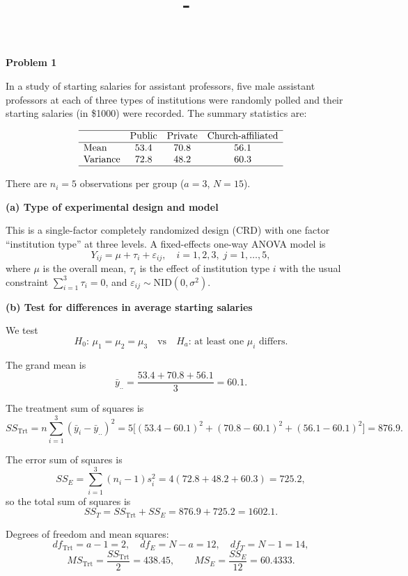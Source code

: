 \documentclass[answers,12pt,addpoints]{exam}
\author{\name}
\title{\course \ - \assignment}
\begin{document}
\maketitle

\textbf{Problem 1}

In a study of starting salaries for assistant professors, five male
assistant professors at each of three types of institutions were randomly
polled and their starting salaries (in \$1000) were recorded. The summary
statistics are:

\[
\begin{array}{lccc}
\hline
 & \text{Public} & \text{Private} & \text{Church-affiliated} \\
\hline
\text{Mean}     & 53.4 & 70.8 & 56.1 \\
\text{Variance} & 72.8 & 48.2 & 60.3 \\
\hline
\end{array}
\]

There are $n_i = 5$ observations per group ($a=3$, $N=15$).

\medskip
\textbf{(a) Type of experimental design and model}

This is a single-factor completely randomized design (CRD) with one factor
``institution type'' at three levels. A fixed-effects one-way ANOVA model is
\[
Y_{ij} = \mu + \tau_i + \varepsilon_{ij},\quad i=1,2,3,\; j=1,\dots,5,
\]
where $\mu$ is the overall mean, $\tau_i$ is the effect of institution type $i$
with the usual constraint $\sum_{i=1}^3 \tau_i = 0$, and
$\varepsilon_{ij} \sim \mathrm{NID}(0,\sigma^2)$.

\medskip
\textbf{(b) Test for differences in average starting salaries}

We test
\[
H_0:\,\mu_1 = \mu_2 = \mu_3
\quad\text{vs}\quad
H_a:\,\text{at least one }\mu_i\text{ differs}.
\]

The grand mean is
\[
\bar{y}_{..} = \frac{53.4 + 70.8 + 56.1}{3} = 60.1.
\]

The treatment sum of squares is
\[
SS_{\text{Trt}}
= n\sum_{i=1}^3(\bar{y}_i - \bar{y}_{..})^2
= 5\bigl[(53.4-60.1)^2 + (70.8-60.1)^2 + (56.1-60.1)^2\bigr]
= 876.9.
\]

The error sum of squares is
\[
SS_E = \sum_{i=1}^3 (n_i - 1)s_i^2
= 4(72.8 + 48.2 + 60.3) = 725.2,
\]
so the total sum of squares is
\[
SS_T = SS_{\text{Trt}} + SS_E = 876.9 + 725.2 = 1602.1.
\]

Degrees of freedom and mean squares:
\[
df_{\text{Trt}} = a-1 = 2,\quad
df_E = N-a = 12,\quad
df_T = N-1 = 14,
\]
\[
MS_{\text{Trt}} = \frac{SS_{\text{Trt}}}{2} = 438.45,\qquad
MS_E = \frac{SS_E}{12} = 60.4333.
\]
\end{document}
